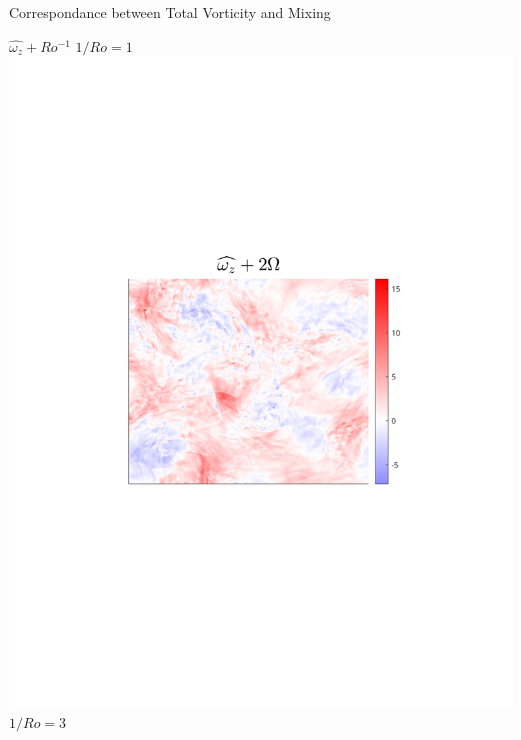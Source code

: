 \documentclass[aspecttatio=169]{beamer}
\begin{document}
\begin{frame}{Correspondance between Total Vorticity and Mixing}

    \centering
        \centering
        {\footnotesize $\widehat{\omega_z} + Ro^{-1}$}
    \emp
        \centering
        $1/Ro = 1$
        \includegraphics[width=1\textwidth]{images/Om1B30_vortz_bar.pdf}
    \emp
        \centering
        $1/Ro = 3$

\end{frame}
\end{document}

